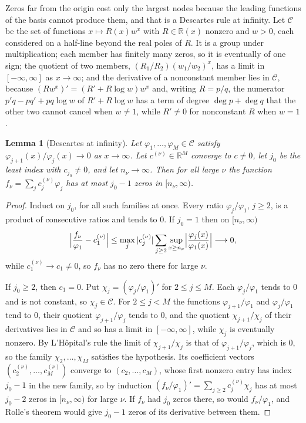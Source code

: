 \documentclass[11pt]{article}
\newtheorem{lemma}[theorem]{Lemma}
\theoremstyle{definition}
\theoremstyle{plain}
\newcommand{\R}{\mathbb R}
\begin{document}
Zeros far from the origin cost only the largest nodes because the leading
functions of the basis cannot produce them, and that is a Descartes rule at
infinity.  Let $\mathcal C$ be the
set of functions $x\mapsto R(x)w^x$ with $R\in\R(x)$ nonzero and $w>0$, each
considered on a half-line beyond the real poles of $R$.  It is a group under
multiplication; each member has finitely many zeros, so it is eventually of
one sign; the quotient of two members,
$(R_1/R_2)(w_1/w_2)^x$, has a limit in $[-\infty,\infty]$ as $x\to\infty$;
and the derivative of a nonconstant member lies in $\mathcal C$, because
$(Rw^x)'=(R'+R\log w)w^x$ and, writing $R=p/q$, the numerator
$p'q-pq'+pq\log w$ of $R'+R\log w$ has a term of degree $\deg p+\deg q$ that
the other two cannot cancel when $w\ne1$, while $R'\ne0$ for nonconstant $R$
when $w=1$.

\begin{lemma}[Descartes at infinity]\label{lem:infinity}
Let $\varphi_1,\ldots,\varphi_M\in\mathcal C$ satisfy
$\varphi_{j+1}(x)/\varphi_j(x)\to0$ as $x\to\infty$.  Let
$c^{(\nu)}\in\R^M$ converge to $c\ne0$, let $j_0$ be the least index with
$c_{j_0}\ne0$, and let $n_\nu\to\infty$.  Then for all large $\nu$ the
function $f_\nu=\sum_jc^{(\nu)}_j\varphi_j$ has at most $j_0-1$ zeros in
$[n_\nu,\infty)$.
\end{lemma}

\begin{proof}
Induct on $j_0$, for all such families at once.  Every ratio
$\varphi_j/\varphi_1$, $j\ge2$, is a product of consecutive ratios and tends
to $0$.  If $j_0=1$ then on $[n_\nu,\infty)$
\[
  \Bigl|\frac{f_\nu}{\varphi_1}-c^{(\nu)}_1\Bigr|
  \le\max_j|c^{(\nu)}_j|\sum_{j\ge2}\sup_{x\ge n_\nu}
  \Bigl|\frac{\varphi_j(x)}{\varphi_1(x)}\Bigr|\longrightarrow0,
\]
while $c^{(\nu)}_1\to c_1\ne0$, so $f_\nu$ has no zero there for large $\nu$.

If $j_0\ge2$, then $c_1=0$.  Put $\chi_j=(\varphi_j/\varphi_1)'$ for
$2\le j\le M$.  Each $\varphi_j/\varphi_1$ tends to $0$ and is not constant,
so $\chi_j\in\mathcal C$.  For $2\le j<M$ the functions
$\varphi_{j+1}/\varphi_1$ and $\varphi_j/\varphi_1$ tend to $0$, their
quotient $\varphi_{j+1}/\varphi_j$ tends to $0$, and the quotient
$\chi_{j+1}/\chi_j$ of their derivatives lies in $\mathcal C$ and so has a
limit in $[-\infty,\infty]$, while $\chi_j$ is eventually nonzero.
By L'H\^opital's rule the limit of $\chi_{j+1}/\chi_j$ is that of
$\varphi_{j+1}/\varphi_j$, which is $0$, so the family $\chi_2,\ldots,\chi_M$ satisfies the hypothesis.  Its coefficient
vectors $(c^{(\nu)}_2,\ldots,c^{(\nu)}_M)$ converge to $(c_2,\ldots,c_M)$,
whose first nonzero entry has index $j_0-1$ in the new family, so by induction
$(f_\nu/\varphi_1)'=\sum_{j\ge2}c^{(\nu)}_j\chi_j$ has at most $j_0-2$ zeros
in $[n_\nu,\infty)$ for large $\nu$.  If $f_\nu$ had $j_0$ zeros there, so
would $f_\nu/\varphi_1$, and Rolle's theorem would give $j_0-1$ zeros of its
derivative between them.
\end{proof}
\end{document}
